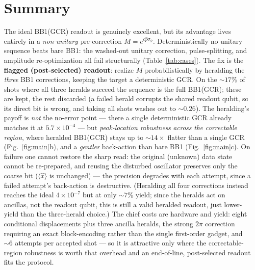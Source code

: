 \documentclass[11pt]{article}
\begin{document}
\FloatBarrier
\section{Summary}
The ideal BB1(GCR) readout is genuinely excellent, but its advantage lives entirely in a
\emph{non-unitary} pre-correction $M=e^{c\hat p\sigma_\phi}$. Deterministically no unitary sequence
beats bare BB1: the washed-out unitary correction, pulse-splitting, and amplitude re-optimization all
fail structurally (Table~\ref{tab:cases}). The fix is the \textbf{flagged (post-selected) readout}:
realize $M$ probabilistically by heralding the \emph{three} BB1 corrections, keeping the target a
deterministic GCR. On the $\sim17\%$ of shots where all three heralds succeed the sequence is the full
BB1(GCR); these are kept, the rest discarded (a failed herald corrupts the shared readout qubit, so
its direct bit is wrong, and taking all shots washes out to $\sim0.26$). The heralding's payoff is
\emph{not} the no-error point --- there a single deterministic GCR already matches it at
$5.7\times10^{-4}$ --- but \emph{peak-location robustness across the correctable region}, where
heralded BB1(GCR) stays up to $\sim14\times$ flatter than a single GCR (Fig.~\ref{fig:main}b),
and a \emph{gentler} back-action than bare BB1 (Fig.~\ref{fig:main}c). On failure one cannot restore
the sharp read: the original (unknown) data state cannot be re-prepared, and reusing the disturbed
oscillator preserves only the coarse bit ($\langle\hat x\rangle$ is unchanged) --- the precision
degrades with each attempt, since a failed attempt's back-action is destructive. (Heralding
all four corrections instead reaches the ideal $4\times10^{-7}$ but at only $\sim7\%$ yield; since the
heralds act on ancillas, not the readout qubit, this is still a valid heralded readout, just
lower-yield than the three-herald choice.) The chief costs are hardware and yield: eight conditional
displacements plus three ancilla
heralds, the strong $2\pi$ correction requiring an exact block-encoding rather than the single
first-order gadget, and $\sim6$ attempts per accepted shot --- so it is attractive only where the
correctable-region robustness is worth that overhead and an end-of-line, post-selected readout fits
the protocol.
\end{document}
